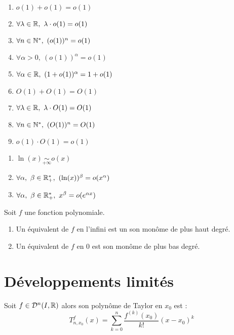\begin{proposition}
	\begin{enumerate}
        \item $o(1) + o(1) = o(1)$
        \item $\forall \lambda \in \mathbb{R},\ \lambda \cdot o(1) = o(1)$
        \item $\forall n \in \mathbb{N}^*,\ (o(1))^n = o(1)$
        \item $\forall \alpha > 0,\ (o(1))^{\alpha} = o(1)$
        \item $\forall \alpha \in \mathbb{R},\ (1 + o(1))^{\alpha} = 1 + o(1)$
        \item $O(1) + O(1) = O(1)$
        \item $\forall \lambda \in \mathbb{R},\ \lambda \cdot O(1) = O(1)$
        \item $\forall n \in \mathbb{N}^*,\ (O(1))^n = O(1)$
        \item $o(1) \cdot O(1) = o(1)$
    \end{enumerate}
\end{proposition}

\begin{proposition}
	\begin{enumerate}
        \item $\ln(x) \underset{+\infty}{\sim} o(x)$
        \item $\forall \alpha,\ \beta \in \R_+^*,\ (\ln(x))^{\beta} = o(x^{\alpha})$
        \item $\forall \alpha,\ \beta \in \R_+^*,\ x^{\beta} = o(e^{\alpha x})$
    \end{enumerate}
\end{proposition}

\begin{proposition}
    Soit $f$ une fonction polynomiale. 
    \begin{enumerate}
        \item Un équivalent de $f$ en l'infini est un son monôme de plus haut degré.
        \item Un équivalent de $f$ en 0 est son monôme de plus bas degré.
    \end{enumerate}
\end{proposition}

\section{Développements limités}

\begin{definition}
    Soit $f \in \mathcal{D}^n(I, \mathbb{R})$ alors son polynôme de Taylor en $x_0$ est :
    \[ T_{n, x_0}^f(x) = \sum_{k = 0}^{n} \frac{f^{(k)}(x_0)}{k!} (x - x_0)^k \]
\end{definition}

